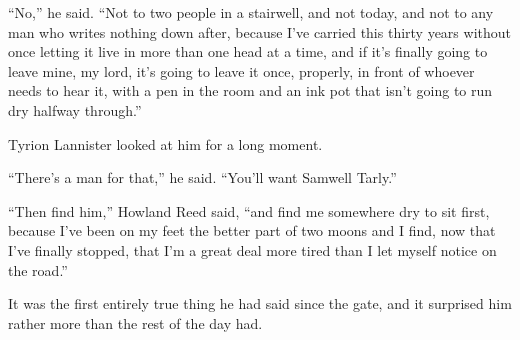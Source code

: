 “No,” he said. “Not to two people in a stairwell, and not today, and not to any man who writes nothing down after, because I’ve carried this thirty years without once letting it live in more than one head at a time, and if it’s finally going to leave mine, my lord, it’s going to leave it once, properly, in front of whoever needs to hear it, with a pen in the room and an ink pot that isn’t going to run dry halfway through.”

Tyrion Lannister looked at him for a long moment.

“There’s a man for that,” he said. “You’ll want Samwell Tarly.”

“Then find him,” Howland Reed said, “and find me somewhere dry to sit first, because I’ve been on my feet the better part of two moons and I find, now that I’ve finally stopped, that I’m a great deal more tired than I let myself notice on the road.”

It was the first entirely true thing he had said since the gate, and it surprised him rather more than the rest of the day had.
